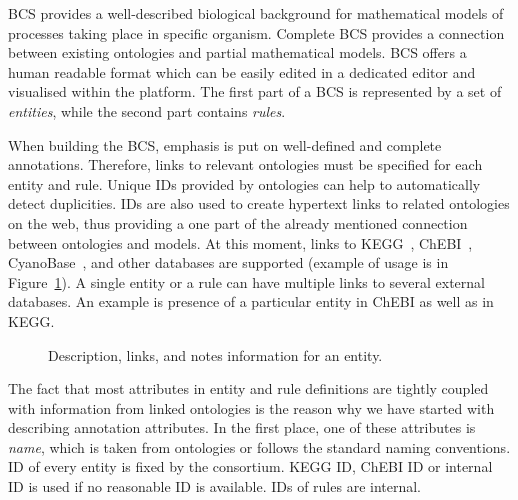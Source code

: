 \documentclass[12pt]{fithesis2}
\begin{document}
BCS provides a well-described biological background for mathematical models of processes taking place in specific organism. Complete BCS provides a connection between existing ontologies and partial mathematical models. BCS offers a human readable format which can be easily edited in a dedicated editor and visualised within the platform. The first part of a BCS is represented by a set of \emph{entities}, while the second part contains \emph{rules}.

When building the BCS, emphasis is put on well-defined and complete annotations. Therefore, links to relevant ontologies must be specified for each entity and rule. Unique IDs provided by ontologies can help to automatically detect duplicities. IDs are also used to create hypertext links to related ontologies on the web, thus providing a one part of the already mentioned connection between ontologies and models. At this moment, links to KEGG~\cite{Kanehisa04012016}, ChEBI~\cite{ChEBI}, CyanoBase~\cite{CyanoBase}, and other databases are supported (example of usage is in Figure~\ref{database_links}). A single entity or a rule can have multiple links to several external databases. An example is presence of a particular entity in ChEBI as well as in KEGG.

\begin{figure}[!h]
\begin{center}
\end{center}
\caption{Description, links, and notes information for an entity.}\label{database_links}
\end{figure}

The fact that most attributes in entity and rule definitions are tightly coupled with information from linked ontologies is the reason why we have started with describing annotation attributes. In the first place, one of these attributes is \emph{name}, which is taken from ontologies or follows the standard naming conventions. ID of every entity is fixed by the consortium. KEGG ID, ChEBI ID or internal ID is used if no reasonable ID is available. IDs of rules are internal.
\end{document}

